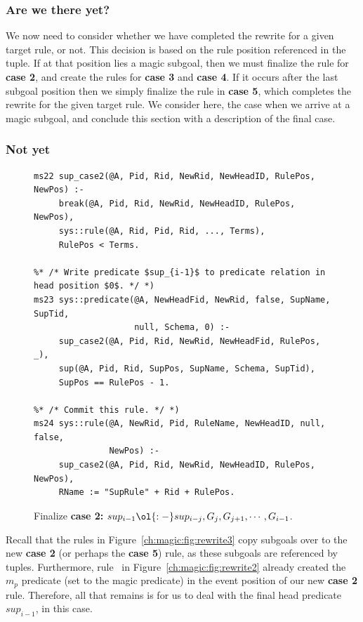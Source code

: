 \subsubsection{Are we there yet?}

We now need to consider whether we have completed the rewrite for a given
target rule, or not.  This decision is based on the rule position referenced in
the  tuple.  If at that position lies a magic subgoal, then we must
finalize the rule for {\bf case 2}, and create the rules for {\bf case 3}
and {\bf case 4}.  If it occurs after the last subgoal position then we simply
finalize the rule in {\bf case 5}, which completes the rewrite for the given
target rule.  We consider here, the case when we arrive at a magic subgoal, and
conclude this section with a description of the final case.

\subsubsection{Not yet}

\begin{figure}
\ssp
\centering
\begin{lstlisting}
ms22 sup_case2(@A, Pid, Rid, NewRid, NewHeadID, RulePos, NewPos) :-
     break(@A, Pid, Rid, NewRid, NewHeadID, RulePos, NewPos),
     sys::rule(@A, Rid, Pid, Rid, ..., Terms),
     RulePos < Terms.

%* /* Write predicate $sup_{i-1}$ to predicate relation in head position $0$. */ *)
ms23 sys::predicate(@A, NewHeadFid, NewRid, false, SupName, SupTid, 
                    null, Schema, 0) :-
     sup_case2(@A, Pid, Rid, NewRid, NewHeadFid, RulePos, _),
     sup(@A, Pid, Rid, SupPos, SupName, Schema, SupTid),
     SupPos == RulePos - 1.
  
%* /* Commit this rule. */ *)
ms24 sys::rule(@A, NewRid, Pid, RuleName, NewHeadID, null, false, 
               NewPos) :-
     sup_case2(@A, Pid, Rid, NewRid, NewHeadID, RulePos, NewPos),
     RName := "SupRule" + Rid + RulePos.
\end{lstlisting}
\caption{\label{ch:magic:fig:rewrite5} 
Finalize {\bf case 2:} $sup_{i-1} \ol{:-} sup_{i-j}, G_j, G_{j+1}, \cdots, G_{i-1}$.}
\end{figure}

Recall that the rules in Figure~\ref{ch:magic:fig:rewrite3} copy subgoals over
to the new {\bf case 2} (or perhaps the {\bf case 5}) rule, as these subgoals are
referenced by  tuples.  Furthermore, rule~ in
Figure~\ref{ch:magic:fig:rewrite2} already created the $m_p$ predicate (set to
the magic predicate) in the event position of our new {\bf case 2} rule.
Therefore, all that remains is for us to deal with the final head predicate
$sup_{i-1}$, in this case.

